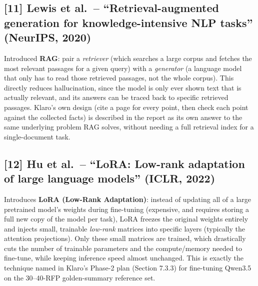 \documentclass[11pt,a4paper]{article}
\begin{document}
\subsection*{[11] Lewis et al.\ -- ``Retrieval-augmented generation for knowledge-intensive NLP
tasks'' (NeurIPS, 2020)}
\label{sec:rag}
Introduced \textbf{RAG}: pair a \emph{retriever} (which searches a large corpus and fetches the most
relevant passages for a given query) with a \emph{generator} (a language model that only has to read
those retrieved passages, not the whole corpus). This directly reduces hallucination, since the model
is only ever shown text that is actually relevant, and its answers can be traced back to specific
retrieved passages. Klaro's own design (cite a page for every point, then check each point against the
collected facts) is described in the report as its own answer to the same underlying problem RAG
solves, without needing a full retrieval index for a single-document task.

\subsection*{[12] Hu et al.\ -- ``LoRA: Low-rank adaptation of large language models'' (ICLR, 2022)}
\label{sec:lora}
Introduces \textbf{LoRA (Low-Rank Adaptation)}: instead of updating all of a large pretrained model's
weights during fine-tuning (expensive, and requires storing a full new copy of the model per task),
LoRA freezes the original weights entirely and injects small, trainable \emph{low-rank} matrices into
specific layers (typically the attention projections). Only these small matrices are trained, which
drastically cuts the number of trainable parameters and the compute/memory needed to fine-tune,
while keeping inference speed almost unchanged. This is exactly the technique named in Klaro's
Phase-2 plan (Section 7.3.3) for fine-tuning Qwen3.5 on the 30--40-RFP golden-summary reference set.
\end{document}
